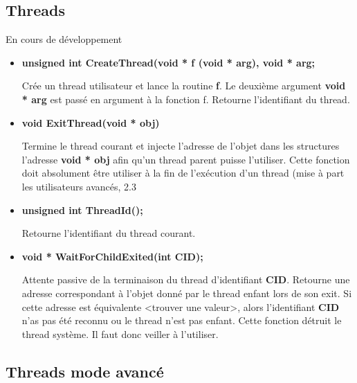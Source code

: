 \documentclass{article}
\begin{document}
\newpage

\subsection{Threads}
En cours de développement
\begin{itemize}

    \item 
    \textbf{unsigned int CreateThread(void * f (void * arg), void * arg;}
    
    Crée un thread utilisateur et lance la routine \textbf{f}. Le deuxième argument 
    \textbf{void * arg} est passé en argument à la fonction f.
    Retourne l'identifiant du thread.
   
   \item 
   \textbf{void ExitThread(void * obj)} 
   
   Termine le thread courant et injecte l'adresse de l'objet dans les structures l'adresse \textbf{void * obj} afin qu'un thread parent puisse l'utiliser. Cette fonction doit absolument être utiliser à la fin de l'exécution d'un thread (mise à part les utilisateurs avancés, 2.3
   
   \item 
   \textbf{unsigned int ThreadId();}
   
  Retourne l'identifiant du thread courant.   
   
   \item
   \textbf{void * WaitForChildExited(int CID);} 
   
   Attente passive de la terminaison du thread d'identifiant \textbf{CID}. Retourne une adresse correspondant à l'objet donné par le thread enfant lors de son exit. Si cette adresse est équivalente <trouver une valeur>, alors l'identifiant \textbf{CID} n'as pas été reconnu ou le thread n'est pas enfant.
   Cette fonction détruit le thread système. Il faut donc veiller à l'utiliser.
   
    
\end{itemize}

\subsection{Threads mode avancé}
\end{document}
